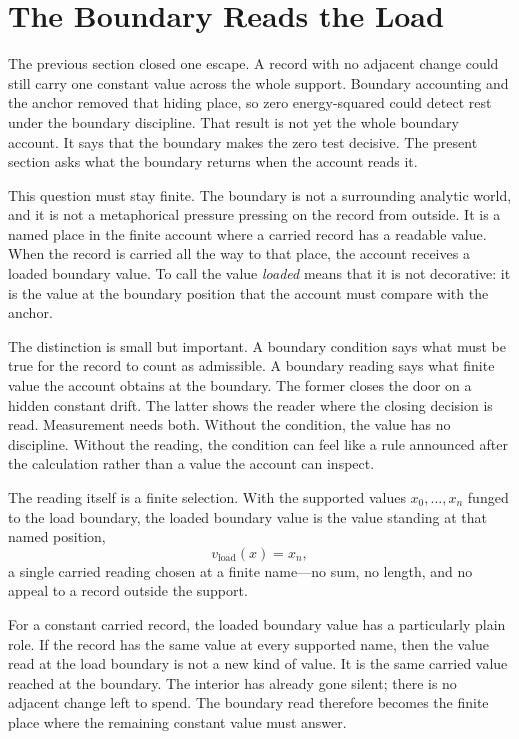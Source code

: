 \section{The Boundary Reads the Load}

The previous section closed one escape. A record with no adjacent change could
still carry one constant value across the whole support. Boundary accounting
and the anchor removed that hiding place, so zero energy-squared could detect
rest under the boundary discipline. That result is not yet the whole boundary
account. It says that the boundary makes the zero test decisive. The present
section asks what the boundary returns when the account reads it.

This question must stay finite. The boundary is not a surrounding analytic
world, and it is not a metaphorical pressure pressing on the record from
outside. It is a named place in the finite account where a carried record has a
readable value. When the record is carried all the way to that place, the
account receives a loaded boundary value. To call the value \emph{loaded} means
that it is not decorative: it is the value at the boundary position that the
account must compare with the anchor.

The distinction is small but important. A boundary condition says what must be
true for the record to count as admissible. A boundary reading says what finite
value the account obtains at the boundary. The former closes the door on a
hidden constant drift. The latter shows the reader where the closing decision
is read. Measurement needs both. Without the condition, the value has no
discipline. Without the reading, the condition can feel like a rule announced
after the calculation rather than a value the account can inspect.

The reading itself is a finite selection. With the supported values
\(x_0,\ldots,x_n\) funged to the load boundary, the loaded boundary value is
the value standing at that named position,
\[
  v_{\mathrm{load}}(x) = x_n ,
\]
a single carried reading chosen at a finite name---no sum, no length, and no
appeal to a record outside the support.

For a constant carried record, the loaded boundary value has a particularly
plain role. If the record has the same value at every supported name, then the
value read at the load boundary is not a new kind of value. It is the same
carried value reached at the boundary. The interior has already gone silent;
there is no adjacent change left to spend. The boundary read therefore becomes
the finite place where the remaining constant value must answer.

